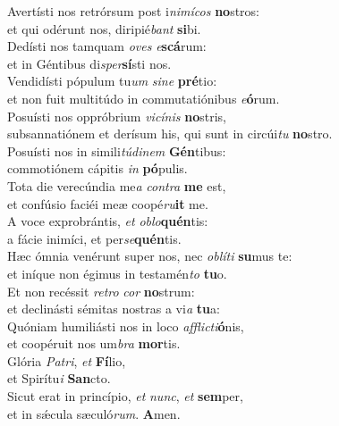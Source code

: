 \evenverse Avertísti nos retrórsum post i\textit{ni}\textit{mí}\textit{cos} \textbf{no}stros:~\*\\
\evenverse et qui odérunt nos, diripié\textit{bant} \textbf{si}bi.\\
\oddverse Dedísti nos tamquam \textit{o}\textit{ves} \textit{e}\textbf{scá}rum:~\*\\
\oddverse et in Géntibus di\textit{sper}\textbf{sí}sti nos.\\
\evenverse Vendidísti pópulum tu\textit{um} \textit{si}\textit{ne} \textbf{pré}tio:~\*\\
\evenverse et non fuit multitúdo in commutatiónibus \textit{e}\textbf{ó}rum.\\
\oddverse Posuísti nos oppróbrium \textit{vi}\textit{cí}\textit{nis} \textbf{no}stris,~\*\\
\oddverse subsannatiónem et derísum his, qui sunt in circúi\textit{tu} \textbf{no}stro.\\
\evenverse Posuísti nos in simili\textit{tú}\textit{di}\textit{nem} \textbf{Gén}tibus:~\*\\
\evenverse commotiónem cápitis \textit{in} \textbf{pó}pulis.\\
\oddverse Tota die verecúndia me\textit{a} \textit{con}\textit{tra} \textbf{me} est,~\*\\
\oddverse et confúsio faciéi meæ coopé\textit{ru}\textbf{it} me.\\
\evenverse A voce exprobrántis, \textit{et} \textit{o}\textit{blo}\textbf{quén}tis:~\*\\
\evenverse a fácie inimíci, et per\textit{se}\textbf{quén}tis.\\
\oddverse Hæc ómnia venérunt super nos, nec \textit{o}\textit{blí}\textit{ti} \textbf{su}mus te:~\*\\
\oddverse et iníque non égimus in testamén\textit{to} \textbf{tu}o.\\
\evenverse Et non recéssit \textit{re}\textit{tro} \textit{cor} \textbf{no}strum:~\*\\
\evenverse et declinásti sémitas nostras a vi\textit{a} \textbf{tu}a:\\
\oddverse Quóniam humiliásti nos in loco \textit{af}\textit{fli}\textit{cti}\textbf{ó}nis,~\*\\
\oddverse et coopéruit nos um\textit{bra} \textbf{mor}tis.\\
\evenverse Glória \textit{Pa}\textit{tri}, \textit{et} \textbf{Fí}lio,~\*\\
\evenverse et Spirítu\textit{i} \textbf{San}cto.\\
\oddverse Sicut erat in princípio, \textit{et} \textit{nunc}, \textit{et} \textbf{sem}per,~\*\\
\oddverse et in sǽcula sæculó\textit{rum}. \textbf{A}men.\\
